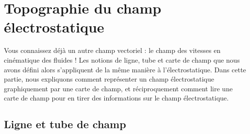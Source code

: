 \documentclass[12pt,fancy]{cours}
\begin{document}


\section{Topographie du champ électrostatique}


Vous connaissez déjà un autre champ vectoriel : le champ des vitesses en cinématique des fluides ! Les notions de ligne, tube et carte de champ que nous avons défini alors s’appliquent de la même manière à l’électrostatique. Dans cette partie, nous expliquons comment représenter un champ électrostatique graphiquement par une carte de champ, et réciproquement comment lire une carte de champ pour en tirer des informations sur le champ électrostatique.

\subsection{Ligne et tube de champ}
\end{document}

